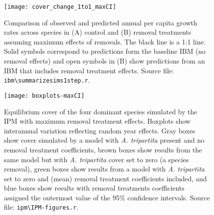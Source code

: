 \documentclass[11pt]{article}
\begin{document}
   \begin{figure}[tbp]
   \centering
   \texttt{[image: cover\_change\_1to1\_maxCI]}
   \caption{Comparison of observed and predicted annual per capita growth rates across species in (A) control and (B) removal treatments assuming maximum effects of removals. The black line is a 1:1 line. Solid symbols correspond to predictions form the baseline IBM (no removal effects) and open symbols in (B) show predictions from an IBM that includes removal treatment effects. Source file: \texttt{ibm\textbackslash summarize\textunderscore sims1step.r}. }
   \label{fig:ObsPred1to1-maxCI}
   \end{figure}
 
  \begin{figure}[tbp]
  \centering
  \texttt{[image: boxplots-maxCI]}
  \caption{Equilibrium cover of the four dominant species simulated by the IPM with maximum removal treatment effects. Boxplots show interannual variation reflecting random year effects. Gray boxes show cover simulated by a model with \textit{A. tripartita} present and no removal treatment coefficients, brown boxes show results from the same model but with \textit{A. tripartita} cover set to zero (a species removal), green boxes show results from a model with  \textit{A. tripartita} set to zero and (mean) removal treatment coefficients included, and blue boxes show results with removal treatments coefficients assigned the outermost value of the 95\% confidence intervals.  Source file: \texttt{ipm\textbackslash IPM-figures.r}.}
  \label{fig:IPMresults-maxCI}
  \end{figure}
\end{document}
